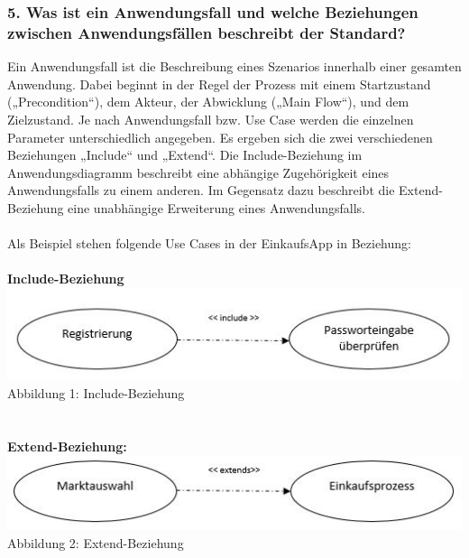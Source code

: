\documentclass[12pt,a4paper]{article}
\begin{document}
\subsubsection*{5. Was ist ein Anwendungsfall und welche Beziehungen zwischen Anwendungsfällen beschreibt der Standard?}
Ein Anwendungsfall ist die Beschreibung eines Szenarios innerhalb einer gesamten Anwendung. 
Dabei beginnt in der Regel der Prozess mit einem Startzustand („Precondition“), dem Akteur, der Abwicklung („Main Flow“), und dem Zielzustand. 
Je nach Anwendungsfall bzw. Use Case werden die einzelnen Parameter unterschiedlich angegeben. Es ergeben sich die zwei verschiedenen Beziehungen „Include“ und „Extend“.
Die Include-Beziehung im Anwendungsdiagramm beschreibt eine abhängige Zugehörigkeit eines Anwendungsfalls zu einem anderen. Im Gegensatz dazu beschreibt die Extend-Beziehung eine unabhängige Erweiterung eines Anwendungsfalls.
\\
\\
Als Beispiel stehen folgende Use Cases in der EinkaufsApp in Beziehung:
\\
\\
\textbf{Include-Beziehung}
\\
\includegraphics[scale=1]{Include_Use-Case.JPG}
\\
\footnotesize Abbildung 1: Include-Beziehung
\normalsize
\\
\\
\\
\textbf{Extend-Beziehung:}
\\
\includegraphics[scale=1]{Extend_Use-Case.JPG}
\\
\footnotesize Abbildung 2: Extend-Beziehung
\normalsize
\\
\end{document}
